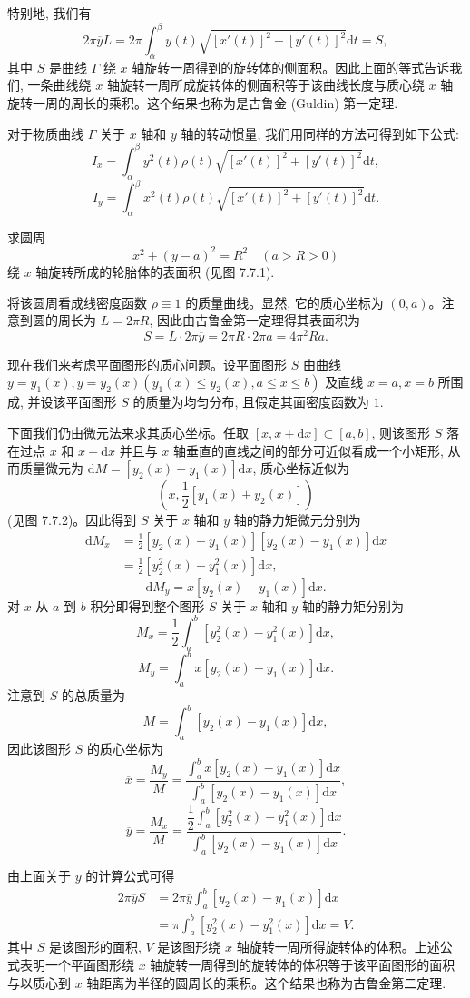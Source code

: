 特别地, 我们有
\[
  2\pi\overline yL
  =2\pi\int_\alpha^\beta y(t)\sqrt{[x'(t)]^2+[y'(t)]^2}\mathrm dt=S,
\]
其中 $S$ 是曲线 $\Gamma$ 绕 $x$ 轴旋转一周得到的旋转体的侧面积。因此上面的等式告诉我们, 一条曲线绕 $x$ 轴旋转一周所成旋转体的侧面积等于该曲线长度与质心绕 $x$ 轴旋转一周的周长的乘积。这个结果也称为是古鲁金 (Guldin) 第一定理.

对于物质曲线 $\Gamma$ 关于 $x$ 轴和 $y$ 轴的转动惯量, 我们用同样的方法可得到如下公式:
\[
  I_x=\int_\alpha^\beta y^2(t)\rho(t)\sqrt{[x'(t)]^2+[y'(t)]^2}\mathrm dt,
\]
\[
  I_y=\int_\alpha^\beta x^2(t)\rho(t)\sqrt{[x'(t)]^2+[y'(t)]^2}\mathrm dt.
\]

\begin{example}\label{example:ma-7-7-1}
求圆周
\[
  x^2+(y-a)^2=R^2\quad(a>R>0)
\]
绕 $x$ 轴旋转所成的轮胎体的表面积 (见图 7.7.1).
\end{example}


\begin{solve}
将该圆周看成线密度函数 $\rho\equiv1$ 的质量曲线。显然, 它的质心坐标为 $(0,a)$。注意到圆的周长为 $L=2\pi R$, 因此由古鲁金第一定理得其表面积为
\[
  S=L\cdot2\pi\overline y=2\pi R\cdot2\pi a=4\pi^2Ra.
\]

现在我们来考虑平面图形的质心问题。设平面图形 $S$ 由曲线 $y=y_1(x),y=y_2(x)(y_1(x)\leq y_2(x),a\leq x\leq b)$ 及直线 $x=a,x=b$ 所围成, 并设该平面图形 $S$ 的质量为均匀分布, 且假定其面密度函数为 $1$.

下面我们仍由微元法来求其质心坐标。任取 $[x,x+\mathrm dx]\subset[a,b]$, 则该图形 $S$ 落在过点 $x$ 和 $x+\mathrm dx$ 并且与 $x$ 轴垂直的直线之间的部分可近似看成一个小矩形, 从而质量微元为 $\mathrm dM=[y_2(x)-y_1(x)]\mathrm dx$, 质心坐标近似为
\[
  \left(x,\frac{1}{2}[y_1(x)+y_2(x)]\right)
\]
(见图 7.7.2)。因此得到 $S$ 关于 $x$ 轴和 $y$ 轴的静力矩微元分别为
\[
\begin{aligned}
  \mathrm dM_x
  &=\frac{1}{2}[y_2(x)+y_1(x)][y_2(x)-y_1(x)]\mathrm dx\\
  &=\frac{1}{2}[y_2^2(x)-y_1^2(x)]\mathrm dx,
\end{aligned}
\]
\[
  \mathrm dM_y=x[y_2(x)-y_1(x)]\mathrm dx.
\]
对 $x$ 从 $a$ 到 $b$ 积分即得到整个图形 $S$ 关于 $x$ 轴和 $y$ 轴的静力矩分别为
\[
  M_x=\frac{1}{2}\int_a^b [y_2^2(x)-y_1^2(x)]\mathrm dx,
\]
\[
  M_y=\int_a^b x[y_2(x)-y_1(x)]\mathrm dx.
\]
注意到 $S$ 的总质量为
\[
  M=\int_a^b [y_2(x)-y_1(x)]\mathrm dx,
\]
因此该图形 $S$ 的质心坐标为
\[
  \overline x=\frac{M_y}{M}
  =\frac{\int_a^b x[y_2(x)-y_1(x)]\mathrm dx}
  {\int_a^b [y_2(x)-y_1(x)]\mathrm dx},
\]
\[
  \overline y=\frac{M_x}{M}
  =\frac{\dfrac{1}{2}\int_a^b [y_2^2(x)-y_1^2(x)]\mathrm dx}
  {\int_a^b [y_2(x)-y_1(x)]\mathrm dx}.
\]

由上面关于 $\overline y$ 的计算公式可得
\[
\begin{aligned}
  2\pi\overline yS
  &=2\pi\overline y\int_a^b [y_2(x)-y_1(x)]\mathrm dx\\
  &=\pi\int_a^b [y_2^2(x)-y_1^2(x)]\mathrm dx=V.
\end{aligned}
\]
其中 $S$ 是该图形的面积, $V$ 是该图形绕 $x$ 轴旋转一周所得旋转体的体积。上述公式表明一个平面图形绕 $x$ 轴旋转一周得到的旋转体的体积等于该平面图形的面积与以质心到 $x$ 轴距离为半径的圆周长的乘积。这个结果也称为古鲁金第二定理.
\end{solve}


